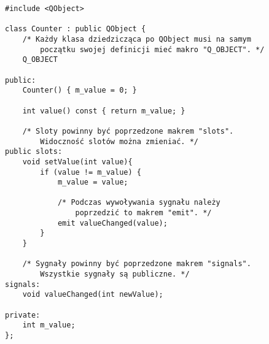 \begin{lstlisting}
#include <QObject>

class Counter : public QObject {
    /* Każdy klasa dziedzicząca po QObject musi na samym
        początku swojej definicji mieć makro "Q_OBJECT". */
    Q_OBJECT

public:
    Counter() { m_value = 0; }

    int value() const { return m_value; }

    /* Sloty powinny być poprzedzone makrem "slots".
        Widoczność slotów można zmieniać. */
public slots:
    void setValue(int value){
        if (value != m_value) {
            m_value = value;

            /* Podczas wywoływania sygnału należy
                poprzedzić to makrem "emit". */
            emit valueChanged(value);
        }
    }

    /* Sygnały powinny być poprzedzone makrem "signals".
        Wszystkie sygnały są publiczne. */
signals:
    void valueChanged(int newValue);

private:
    int m_value;
};

\end{lstlisting}
